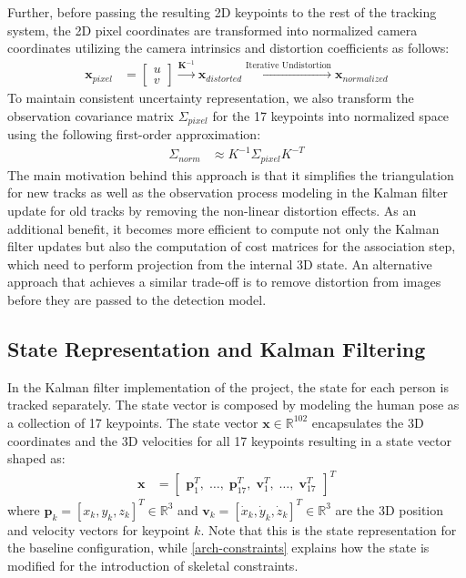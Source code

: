 Further, before passing the resulting 2D keypoints to the rest of the tracking system, the 2D pixel coordinates are transformed into normalized camera coordinates utilizing the camera intrinsics and distortion coefficients as follows:
\begin{align*}
    \mathbf{x}_{pixel} &= \begin{bmatrix} u \\ v \end{bmatrix} \xrightarrow{\mathbf{K}^{-1}} \mathbf{x}_{distorted} \xrightarrow{\text{Iterative Undistortion}} \mathbf{x}_{normalized}
\end{align*}
To maintain consistent uncertainty representation, we also transform the observation covariance matrix $\Sigma_{pixel}$ for the 17 keypoints into normalized space using the following first-order approximation:
\begin{align*}
    \Sigma_{norm} &\approx K^{-1} \Sigma_{pixel} K^{-T}
\end{align*}
The main motivation behind this approach is that it simplifies the triangulation for new tracks as well as the observation process modeling in the Kalman filter update for old tracks by removing the non-linear distortion effects. As an additional benefit, it becomes more efficient to compute not only the Kalman filter updates but also the computation of cost matrices for the association step, which need to perform projection from the internal 3D state. An alternative approach that achieves a similar trade-off is to remove distortion from images before they are passed to the detection model.


\subsection{State Representation and Kalman Filtering} \label{arch-filter}

In the Kalman filter implementation of the project, the state for each person is tracked separately. The state vector is composed by modeling the human pose as a collection of 17 keypoints. The state vector $\mathbf{x} \in \mathbb{R}^{102}$ encapsulates the 3D coordinates and the 3D velocities for all 17 keypoints resulting in a state vector shaped as:
\begin{align*}
    \mathbf{x} &= \begin{bmatrix} \mathbf{p}_1^T, \; \dots, \; \mathbf{p}_{17}^T, \; \mathbf{v}_1^T, \; \dots, \; \mathbf{v}_{17}^T \end{bmatrix}^T
\end{align*}
where $\mathbf{p}_k = [x_k, y_k, z_k]^T \in \mathbb{R}^3$ and $\mathbf{v}_k = [\dot{x}_k, \dot{y}_k, \dot{z}_k]^T \in \mathbb{R}^3$ are the 3D position and velocity vectors for keypoint $k$. Note that this is the state representation for the baseline configuration, while \cref{arch-constraints} explains how the state is modified for the introduction of skeletal constraints.

